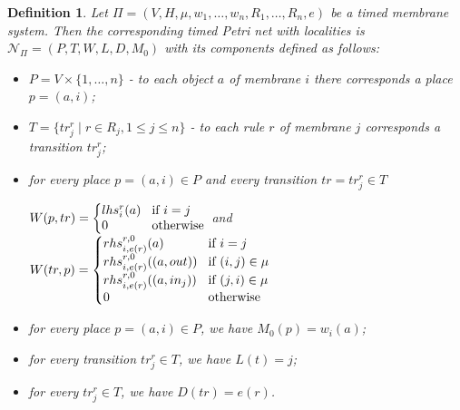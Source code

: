 \documentclass{eptcs}
\newtheorem{definition}{Definition}
\begin{document}
\begin{definition}
\label{definition:translation} Let
$\Pi=(V,H,\mu,w_1,\ldots,w_n,R_1,\ldots,R_n,e)$ be a timed membrane
system. Then the corresponding timed Petri net with localities is
$\mathcal{N}_\Pi=(P,T,W,L,D,M_0)$ with its components defined as
follows:

\begin{itemize}
\item $P=V \times \{1,\ldots,n\}$ - to each object $a$ of
membrane $i$ there corresponds a place $p=(a,i)$;

\item $T=\{tr^r_j \mid r\in R_j, 1\leq j \leq n\}$ - to
each rule $r$ of membrane $j$ corresponds a transition $tr^r_j$;

\item for every place $p=(a,i) \in P$ and every transition $tr=tr^r_j \in T$

\begin{math} W(p,tr)= \left\{
{\begin{tabular}{@{\hspace{0ex}}l@{\hspace{2ex}}l@{\hspace{0ex}}}
    $lhs^r_i(a)$ & if $i=j$\\
    $0$ & otherwise\\
\end{tabular}} \right.
\end{math} and
\begin{math} W(tr,p)= \left\{
{\begin{tabular}{@{\hspace{0ex}}l@{\hspace{2ex}}l@{\hspace{0ex}}}
    $rhs^{r,0}_{i,e(r)}(a)$ & if $i=j$\\
    $rhs^{r,0}_{i,e(r)}((a,out))$ & if $(i,j)\in \mu$\\
    $rhs^{r,0}_{i,e(r)}((a,in_j))$ & if $(j,i)\in \mu$\\
    $0$ & otherwise\\
\end{tabular}} \right.
\end{math}

\item for every place $p = (a, i) \in P$, we have $M_0(p) = w_i(a)$;
\item for every transition $tr^r_j \in T$, we have $L(t)=j$;
\item for every $tr^r_j \in T$, we have $D(tr)=e(r)$.
\end{itemize}
\end{definition}
\end{document}
